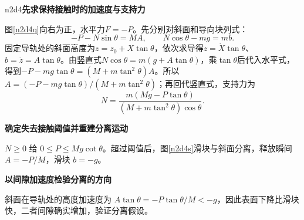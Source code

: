 \begin{drillsolution}{n2d4}\textbf{先求保持接触时的加速度与支持力}\par\nobreak
图\ref{n2d4q}向右为正，水平力$F=-P$。先分别对斜面和导向块列式：
\[
-P-N\sin\theta=MA,\qquad N\cos\theta-mg=mb.
\]
固定导轨处的斜面高度为$z=z_0+X\tan\theta$，依次求导得$\dot z=\dot X\tan\theta$、$b=\ddot z=A\tan\theta$。由竖直式$N\cos\theta=m(g+A\tan\theta)$，乘$\tan\theta$后代入水平式，得到$-P-mg\tan\theta=(M+m\tan^2\theta)A$。所以$A=(-P-mg\tan\theta)/(M+m\tan^2\theta)$；再回代竖直式，支持力为
\[N=\frac{m(Mg-P\tan\theta)}{(M+m\tan^2\theta)\cos\theta}.\]


\par\medskip{}\noindent\textbf{确定失去接触阈值并重建分离运动}\par\nobreak
$N\ge0$ 给 $0\le P\le Mg\cot\theta$。超过阈值后，图\ref{n2d4s}滑块与斜面分离，释放瞬间 $A=-P/M$，滑块 $b=-g$。

\par\medskip{}\noindent\textbf{以间隙加速度检验分离的方向}\par\nobreak
斜面在导轨处的高度加速度为 $A\tan\theta=-P\tan\theta/M<-g$，因此表面下降比滑块快，二者间隙确实增加，验证分离假设。
\end{drillsolution}
